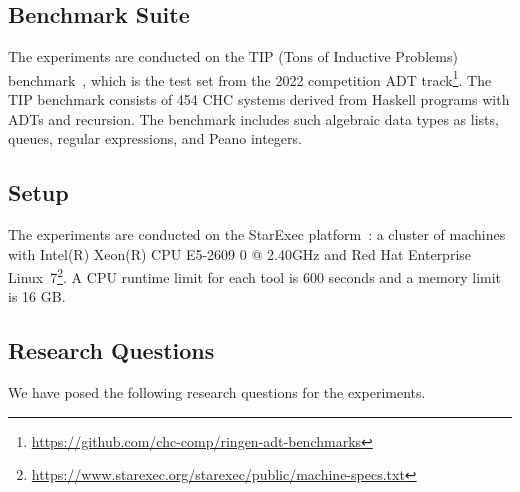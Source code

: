 \subsection{Benchmark Suite}
The experiments are conducted on the TIP (Tons of Inductive Problems) benchmark~\cite{claessen2015tip}, which is the test set from the \chccomp{} 2022 competition ADT track\footnote{\url{https://github.com/chc-comp/ringen-adt-benchmarks}}. The TIP benchmark consists of 454 CHC systems derived from Haskell programs with ADTs and recursion. The benchmark includes such algebraic data types as lists, queues, regular expressions, and Peano integers.

\subsection{Setup}
The experiments are conducted on the StarExec platform~\cite{stump2014starexec}: a cluster of machines with Intel(R) Xeon(R) CPU E5-2609 0 @ 2.40GHz and Red Hat Enterprise Linux~7\footnote{\url{https://www.starexec.org/starexec/public/machine-specs.txt}}. A CPU runtime limit for each tool is 600 seconds and a memory limit is 16 GB.

\subsection{Research Questions}

We have posed the following research questions for the experiments.

